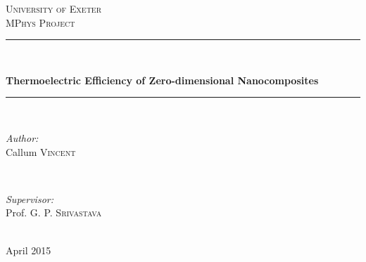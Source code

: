 \begin{titlepage}
\center
\textsc{\huge University of Exeter}\\[1cm]
\textsc{\Large MPhys Project}\\[1.5cm]

\rule{\linewidth}{0.5mm}\\[0.4cm]
\begin{doublespace}
{\LARGE \textbf{Thermoelectric Efficiency of Zero-dimensional Nanocomposites}}\\[0cm]
\end{doublespace}
\rule{\linewidth}{0.5mm}\\[2.5cm]
 
\begin{minipage}{0.4\textwidth}
\begin{flushleft} \large
\emph{Author:}\\
Callum \textsc{Vincent}
\end{flushleft}
\end{minipage}
~
\begin{minipage}{0.4\textwidth}
\begin{flushright} \large
\emph{Supervisor:} \\
Prof. G. P. \textsc{Srivastava}
\end{flushright}
\end{minipage}\\[4cm]


{\large April 2015}\\[3cm]


\pagedecorationleft
\pagedecorationright

\end{titlepage}